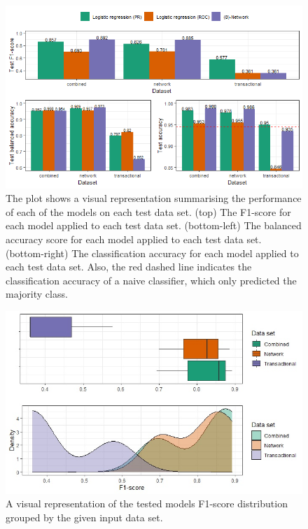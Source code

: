 \begin{figure}
	\begin{center}
		\includegraphics[scale = 0.8]{fig/CH3/data_sets_summary_bar.png}
		\caption{The plot shows a visual representation summarising the performance of each of the models on each test data set. (top) The F1-score for each model applied to each test data set. (bottom-left) The balanced accuracy score for each model applied to each test data set. (bottom-right) The classification accuracy for each model applied to each test data set. Also, the red dashed line indicates the classification accuracy of a naive classifier, which only predicted the majority class.}
		\label{fig:ch3_final_results_bar}
	\end{center}	
\end{figure}

\begin{figure}
	\begin{center}
		\includegraphics[scale = 0.6]{fig/CH3/data_sets_test_f1_density_LI.jpg}
		\caption{A visual representation of the tested models F1-score distribution grouped by the given input data set.}
		\label{fig:ch3_final_results_f1_density}
	\end{center}	
\end{figure}

